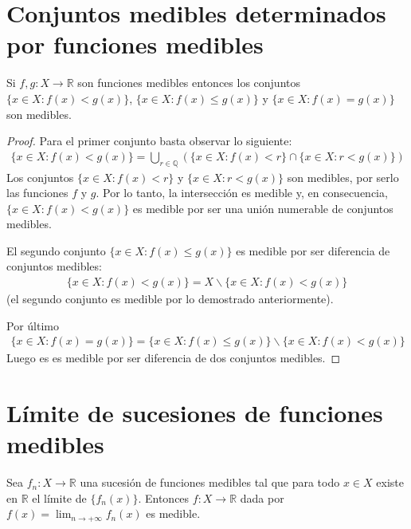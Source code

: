\section{Conjuntos medibles determinados por funciones medibles}
\begin{prop}
    \label{prop:cmedible}
    Si $f,g: X \longrightarrow \mathbb{R}$ son funciones medibles entonces los conjuntos $\{ x \in X : f(x) < g(x)\}$, $\{ x \in X : f(x) \leq g(x)\}$ y $\{ x \in X : f(x) = g(x)\}$ son medibles.
\end{prop}
\begin{proof}
    Para el primer conjunto basta observar lo siguiente:
    \begin{align*}
        \{ x \in X : f(x) < g(x)\} = \bigcup_{r \in \mathbb{Q}}{( \{ x \in X : f(x) < r\} \cap \{ x \in X : r < g(x)\} )}
    \end{align*}
    Los conjuntos $\{ x \in X : f(x) < r\}$ y $\{ x \in X : r < g(x)\}$ son medibles, por serlo las funciones $f$ y $g$. Por lo tanto, la intersección es medible y, en consecuencia, $\{ x \in X : f(x) < g(x)\}$ es medible por ser una unión numerable de conjuntos medibles.

    El segundo conjunto $\{ x \in X : f(x) \leq g(x)\}$ es medible por ser diferencia de conjuntos medibles:
    \begin{align*}
        \{ x \in X : f(x) < g(x)\} = X \backslash \{ x \in X : f(x) < g(x)\}
    \end{align*}
    (el segundo conjunto es medible por lo demostrado anteriormente).

    Por último
    \begin{align*}
        \{ x \in X : f(x) = g(x)\} = \{ x \in X : f(x) \leq g(x)\} \backslash \{ x \in X : f(x) < g(x)\}
    \end{align*}
    Luego es es medible por ser diferencia de dos conjuntos medibles.
\end{proof}

\section{Límite de sucesiones de funciones medibles}
\begin{prop}
    Sea $f_n: X \longrightarrow \mathbb{R}$ una sucesión de funciones medibles tal que para todo $x \in X$ existe en $\mathbb{R}$ el límite de $\{ f_n(x)\}$. Entonces $f: X \longrightarrow \mathbb{R}$ dada por $f(x) = \lim_{n \to +\infty}{f_n(x)}$ es medible.
\end{prop}

